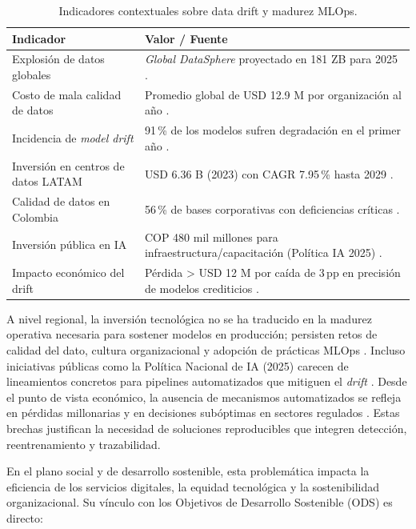 \begin{table}[H]
\centering
\caption{Indicadores contextuales sobre data drift y madurez MLOps.}
\label{tab:contexto-mlops}
\begin{tabular}{p{5cm}p{8cm}}
\toprule
\textbf{Indicador} & \textbf{Valor / Fuente} \\
\midrule
Explosión de datos globales & \emph{Global DataSphere} proyectado en 181 ZB para 2025 \citep{IDC2024}. \\
Costo de mala calidad de datos & Promedio global de USD 12.9 M por organización al año \citep{Gartner2024}. \\
Incidencia de \emph{model drift} & 91\,\% de los modelos sufren degradación en el primer año \citep{AIMultiple2025,Breck2019}. \\
Inversión en centros de datos LATAM & USD 6.36 B (2023) con CAGR 7.95\,\% hasta 2029 \citep{Helmi2024}. \\
Calidad de datos en Colombia & 56\,\% de bases corporativas con deficiencias críticas \citep{Deyde2023}. \\
Inversión pública en IA & COP 480 mil millones para infraestructura/capacitación (Política IA 2025) \citep{CONPES2025}. \\
Impacto económico del drift & Pérdida > USD 12 M por caída de 3\,pp en precisión de modelos crediticios \citep{Kim2018}. \\
\bottomrule
\end{tabular}
\end{table}

A nivel regional, la inversión tecnológica no se ha traducido en la madurez operativa necesaria para sostener modelos en producción; persisten retos de calidad del dato, cultura organizacional y adopción de prácticas MLOps \citep{Helmi2024,Deyde2023}. Incluso iniciativas públicas como la Política Nacional de IA (2025) carecen de lineamientos concretos para pipelines automatizados que mitiguen el \emph{drift} \citep{CONPES2025}. Desde el punto de vista económico, la ausencia de mecanismos automatizados se refleja en pérdidas millonarias y en decisiones subóptimas en sectores regulados \citep{Kim2018}. Estas brechas justifican la necesidad de soluciones reproducibles que integren detección, reentrenamiento y trazabilidad.

En el plano social y de desarrollo sostenible, esta problemática impacta la eficiencia de los servicios digitales, la equidad tecnológica y la sostenibilidad organizacional. Su vínculo con los Objetivos de Desarrollo Sostenible (ODS) es directo:


